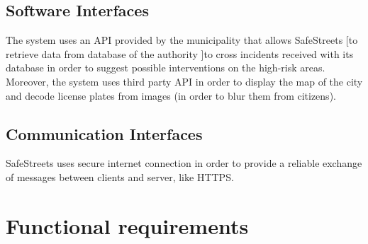 \documentclass[../RASD.tex]{subfiles}
\begin{document}
            \subsection{Software Interfaces}\label{subsec:software-interfaces}
            The system uses an API provided by the municipality that allows SafeStreets [to retrieve data from database of the authority ]to cross incidents received with its database in order to suggest possible interventions on the high-risk areas. Moreover, the system uses third party API in order to display the map of the city and decode license plates from images (in order to blur them from citizens).
            \subsection{Communication Interfaces}\label{subsec:communication-interface}
            SafeStreets uses secure internet connection in order to provide a reliable exchange of messages between clients and server, like HTTPS.
        \section{Functional requirements}\label{sec:functional-requirements}
\end{document}
